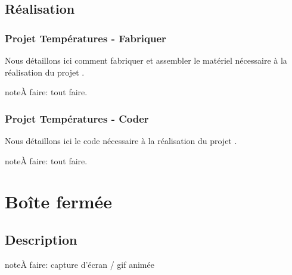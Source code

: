 \documentclass[letterpaper,10pt,french]{sphinxmanual}
\begin{document}
\subsection{Réalisation}
\label{\detokenize{projets/temperature:realisation}}

\subsubsection{Projet Températures - Fabriquer}
\label{\detokenize{projets/temperature-fabriquer:projet-projettemp-fabriquer}}\label{\detokenize{projets/temperature-fabriquer::doc}}
Nous détaillons ici comment fabriquer et assembler
le matériel nécessaire à la réalisation du projet
{\hyperref[\detokenize{projets/temperature:projettemp}]{}}.

\begin{sphinxadmonition}{note}{\label{projets/temperature-fabriquer:index-0}À faire:}
tout faire.
\end{sphinxadmonition}


\subsubsection{Projet Températures - Coder}
\label{\detokenize{projets/temperature-coder:projet-projettemp-coder}}\label{\detokenize{projets/temperature-coder::doc}}
Nous détaillons ici le code nécessaire à la réalisation
du projet {\hyperref[\detokenize{projets/temperature:projettemp}]{}}.

\begin{sphinxadmonition}{note}{\label{projets/temperature-coder:index-0}À faire:}
tout faire.
\end{sphinxadmonition}


\section{Boîte fermée}
\label{\detokenize{projets/boite-fermee:boite-fermee}}\label{\detokenize{projets/boite-fermee::doc}}\label{\detokenize{projets/boite-fermee:projetboite}}

\subsection{Description}
\label{\detokenize{projets/boite-fermee:description}}
\begin{sphinxadmonition}{note}{\label{projets/boite-fermee:index-0}À faire:}
capture d’écran / gif animée
\end{sphinxadmonition}
\end{document}
